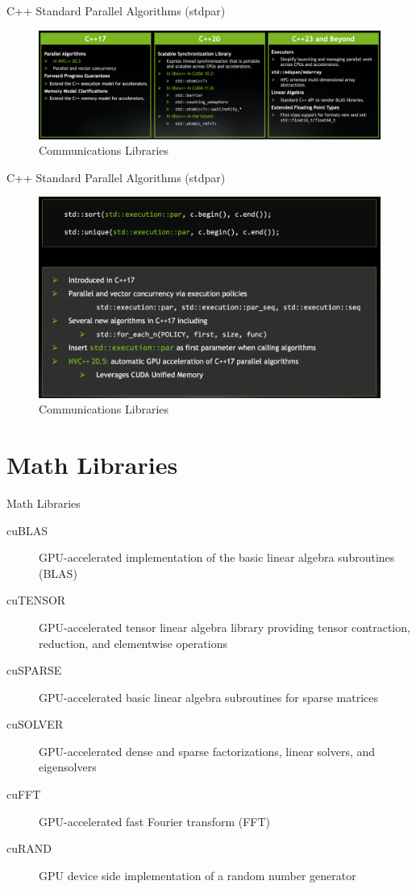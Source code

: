 \documentclass[aspectratio=169]{beamer}
\begin{document}
\begin{frame}{C++ Standard Parallel Algorithms (stdpar)}
\begin{figure}
  \includegraphics[width=\linewidth]{figures/cpp.png}
  \caption{Communications Libraries}
\end{figure}
\end{frame}

\begin{frame}{C++ Standard Parallel Algorithms (stdpar)}
\begin{figure}
  \includegraphics[height=0.75\textheight]{figures/cpp_1.png}
  \caption{Communications Libraries}
\end{figure}
\end{frame}

\section{Math Libraries}

\begin{frame}{Math Libraries}
\begin{description}
  \item[cuBLAS] GPU-accelerated implementation of the basic linear algebra subroutines (BLAS)
  \item[cuTENSOR] GPU-accelerated tensor linear algebra library providing tensor contraction, reduction, and elementwise operations
  \item[cuSPARSE] GPU-accelerated basic linear algebra subroutines for sparse matrices
  \item[cuSOLVER] GPU-accelerated dense and sparse factorizations, linear solvers, and eigensolvers
  \item[cuFFT] GPU-accelerated fast Fourier transform (FFT)
  \item[cuRAND] GPU device side implementation of a random number generator
\end{description}
\end{frame}
\end{document}
